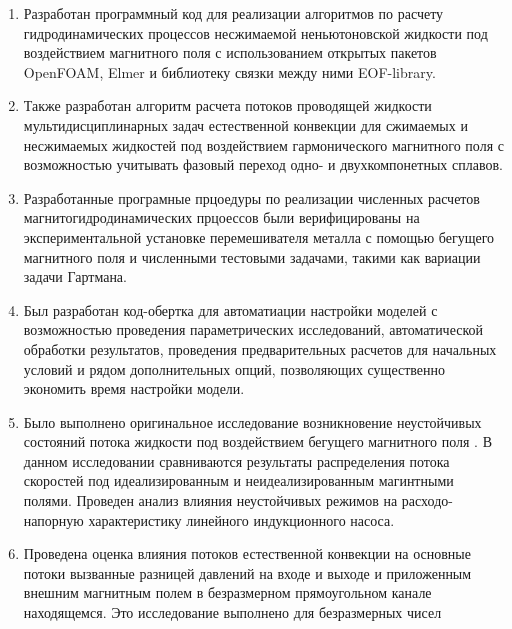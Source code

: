 {\novelty}
\begin{enumerate}[beginpenalty=10000] %
  
  \item Разработан программный код для реализации алгоритмов по расчету гидродинамических процессов  несжимаемой неньютоновской жидкости под воздействием магнитного поля с использованием открытых пакетов OpenFOAM, Elmer и библиотеку связки между ними EOF-library.
    
  \item Также разработан алгоритм расчета потоков проводящей жидкости мультидисциплинарных задач естественной конвекции для сжимаемых и несжимаемых жидкостей под воздействием гармонического магнитного поля с возможностью учитывать фазовый переход одно- и двухкомпонетных сплавов. 
  
  \item Разработанные програмные прцоедуры по реализации численных расчетов магнитогидродинамических прцоессов были верифицированы на экспериментальной установке перемешивателя металла с помощью бегущего магнитного поля и численными тестовыми задачами, такими как вариации задачи Гартмана. 
  
  \item Был разработан код-обертка для автоматиации настройки моделей с возможностью проведения параметрических исследований, автоматической обработки результатов, проведения предварительных расчетов для начальных условий и рядом дополнительных опций, позволяющих существенно экономить время настройки модели. 
    
  \item Было выполнено оригинальное исследование возникновение неустойчивых состояний потока жидкости под воздействием бегущего магнитного поля 
  . В данном исследовании сравниваются результаты распределения потока скоростей под идеализированным и неидеализированным магинтными полями. Проведен анализ влияния неустойчивых режимов на расходо-напорную характеристику линейного индукционного насоса. 
  
  \item Проведена оценка влияния потоков естественной конвекции на основные потоки вызванные разницей давлений на входе и выходе и приложенным внешним магнитным полем в безразмерном прямоугольном канале находящемся. Это исследование выполнено для безразмерных чисел  
  
   
\end{enumerate}

